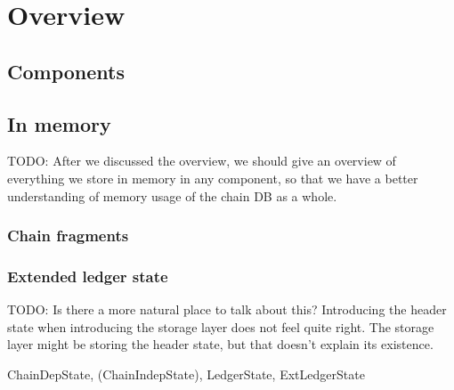 \chapter{Overview}
\label{storage}

\section{Components}
\label{storage:components}


\section{In memory}
\label{storage:inmemory}

TODO: After we discussed the overview, we should give an overview of everything
we store in memory in any component, so that we have a better understanding of
memory usage of the chain DB as a whole.

\subsection{Chain fragments}
\label{storage:fragments}

\subsection{Extended ledger state}
\label{storage:extledgerstate}
\label{storage:headerstate}

TODO: Is there a more natural place to talk about this? Introducing the
header state when introducing the storage layer does not feel quite right.
The storage layer might be storing the header state, but that doesn't
explain its existence.

ChainDepState, (ChainIndepState), LedgerState, ExtLedgerState
